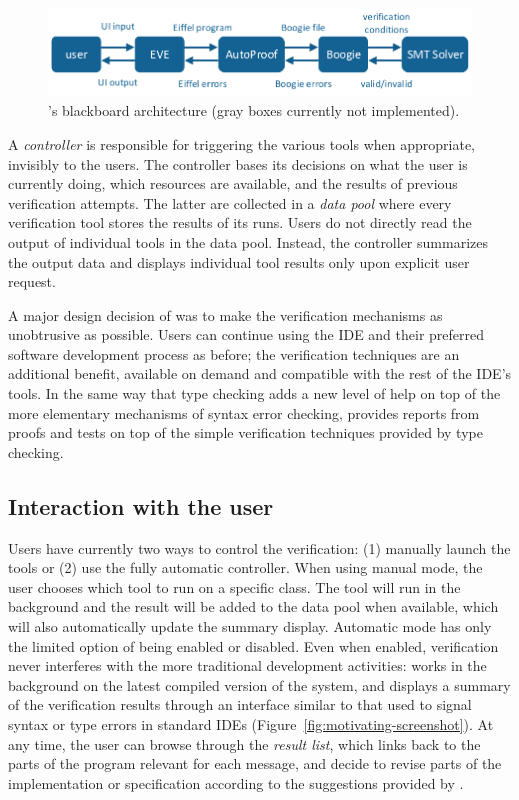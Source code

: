 \begin{figure}[!ht]%
\centering
\includegraphics[width=0.8\columnwidth,page=4]{images/drawings.pdf}
\caption{\EVE's blackboard architecture (gray boxes currently not implemented).}%
\label{fig:blackboard}%
\end{figure}


A \emph{controller} is responsible for triggering the various tools when appropriate, invisibly to the users. 
The controller bases its decisions on what the user is currently doing, which resources are available, and the results of previous verification attempts.
The latter are collected in a \emph{data pool} where every verification tool stores the results of its runs.
Users do not directly read the output of individual tools in the data pool.
Instead, the controller summarizes the output data and displays individual tool results only upon explicit user request.

A major design decision of \EVE was to make the verification mechanisms as unobtrusive as possible.
Users can continue using the IDE and their preferred software development process as before; the verification techniques are an additional benefit, available on demand and compatible with the rest of the IDE's tools.
In the same way that type checking adds a new level of help on top of the more elementary mechanisms of syntax error checking, \EVE provides reports from proofs and tests on top of the simple verification techniques provided by type checking.

\subsection{Interaction with the user}

Users have currently two ways to control the verification: (1) manually launch the tools or (2) use the fully automatic controller.
When using manual mode, the user chooses which tool to run on a specific class.
The tool will run in the background and the result will be added to the data pool when available, which will also automatically update the summary display.
Automatic mode has only the limited option of being enabled or disabled.
Even when enabled, verification never interferes with the more traditional development activities: \EVE works in the background on the latest compiled version of the system, and displays a summary of the verification results through an interface similar to that used to signal syntax or type errors in standard IDEs (Figure~\ref{fig:motivating-screenshot}).
At any time, the user can browse through the \emph{result list}, which links back to the parts of the program relevant for each message, and decide to revise parts of the implementation or specification according to the suggestions provided by \EVE.

